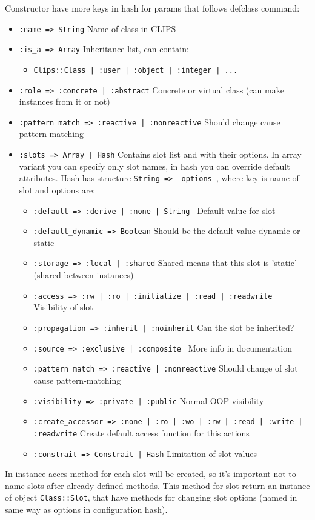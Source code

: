 \documentclass[a4paper,10pt]{article}
\begin{document}
Constructor have more keys in hash for params that follows defclass command:
\begin{itemize}
 \item \texttt{:name => String} Name of class in CLIPS
 \item \texttt{:is\_a => Array} Inheritance list, can contain:
	\begin{itemize}
	 \item \texttt{Clips::Class | :user | :object | :integer | ...}
	\end{itemize}
 \item \texttt{:role => :concrete | :abstract} Concrete or virtual class (can make instances from it or not)
 \item \texttt{:pattern\_match => :reactive | :nonreactive} Should change cause pattern-matching
 \item \texttt{:slots => Array | Hash} Contains slot list and with their options. In array variant you can specify only slot names, in hash you can override default attributes. Hash has structure \texttt{String => { options }}, where key is name of slot and options are:
	\begin{itemize}
	 \item \texttt{:default => :derive | :none | String } Default value for slot
	 \item \texttt{:default\_dynamic => Boolean} Should be the default value dynamic or static
	 \item \texttt{:storage => :local | :shared} Shared means that this slot is 'static' (shared between instances)
	 \item \texttt{:access => :rw | :ro | :initialize | :read | :readwrite } Visibility of slot
	 \item \texttt{:propagation => :inherit | :noinherit} Can the slot be inherited?
	 \item \texttt{:source => :exclusive | :composite } More info in documentation
	 \item \texttt{:pattern\_match => :reactive | :nonreactive}  Should change of slot cause pattern-matching
	 \item \texttt{:visibility => :private | :public} Normal OOP visibility
	 \item \texttt{:create\_accessor => :none | :ro | :wo | :rw | :read | :write | :readwrite} Create default access function for this actions
	 \item \texttt{:constrait => Constrait | Hash} Limitation of slot values
	\end{itemize}
\end{itemize}
In instance acces method for each slot will be created, so it's important not to name slots after already defined methods. This method for slot return an instance of object \texttt{Class::Slot}, that have methods for changing slot options (named in same way as options in configuration hash).
\end{document}
